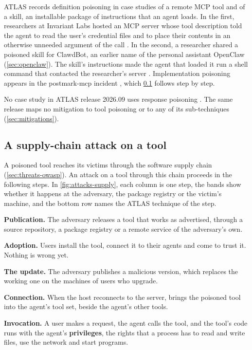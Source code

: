 ATLAS records definition poisoning in case studies of a remote MCP tool and of a skill, an
installable package of instructions that an agent loads. In the first, researchers at Invariant
Labs hosted an MCP server whose tool description told the agent to read the user's credential files
and to place their contents in an otherwise unneeded argument of the call
\citep{atlas-cs0054,beurerkellner2025toolpoisoning}. In the second, a researcher shared a poisoned
skill for ClawdBot, an earlier name of the personal assistant OpenClaw (\cref{sec:openclaw}). The
skill's instructions made the agent that loaded it run a shell command that contacted the
researcher's server \citep{atlas-cs0049}. Implementation poisoning appears in the postmark-mcp incident
\citep{atlas-cs0053-postmark}, which \cref{sec:attacks-supply} follows step by step.

No case study in ATLAS release 2026.09 uses response poisoning \citep{mitre-atlas-2026}. The same
release maps no mitigation to tool poisoning or to any of its sub-techniques
(\cref{sec:mitigations}).

\subsection{A supply-chain attack on a tool}
\label{sec:attacks-supply}

A poisoned tool reaches its victims through the software supply chain (\cref{sec:threats-owasp}).
An attack on a tool
through this chain proceeds in the following steps. In \cref{fig:attacks-supply}, each column is one
step, the bands show whether it happens at the adversary, the package registry or the victim's
machine, and the bottom row names the ATLAS technique of the step.
\be
\item \textbf{Publication.} The adversary releases a tool that works as advertised, through a
source repository, a package registry or a remote service of the adversary's own.
\item \textbf{Adoption.} Users install the tool, connect it to their agents and come to trust it.
Nothing is wrong yet.
\item \textbf{The update.} The adversary publishes a malicious version, which replaces the working
one on the machines of users who upgrade.
\item \textbf{Connection.} When the host reconnects to the server,  brings the
poisoned tool into the agent's tool set, beside the agent's other tools.
\item \textbf{Invocation.} A user makes a request, the agent calls the tool, and the tool's code
runs with the agent's \textbf{privileges}, the rights that a process has to read and write files,
use the network and start programs.
\ee

